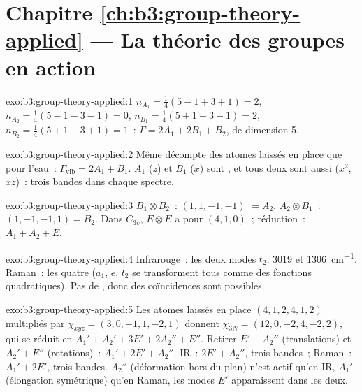 \section*{Chapitre \ref{ch:b3:group-theory-applied} --- La théorie des groupes en action}

\begin{solution}{exo:b3:group-theory-applied:1}
$n_{A_1} = \frac14(5 - 1 + 3 + 1) = 2$, $n_{A_2} = \frac14(5 - 1 - 3 - 1) = 0$,
$n_{B_1} = \frac14(5 + 1 + 3 - 1) = 2$, $n_{B_2} = \frac14(5 + 1 - 3 + 1) = 1$~:
$\Gamma = 2A_1 + 2B_1 + B_2$, de dimension 5.
\end{solution}

\begin{solution}{exo:b3:group-theory-applied:2}
Même décompte des atomes laissés en place que pour l'eau~: $\Gamma_{\mathrm{vib}} = 2A_1 + B_1$.
$A_1$ ($z$) et
$B_1$ ($x$) sont , et tous deux sont aussi 
($x^2$, $xz$)~: trois bandes dans chaque spectre.
\end{solution}

\begin{solution}{exo:b3:group-theory-applied:3}
$B_1\otimes B_2$~:  $(1, 1, -1, -1)$ $= A_2$. $A_2\otimes B_1$~: $(1, -1, -1,
1) = B_2$. Dans $C_{3v}$, $E\otimes E$ a pour  $(4, 1, 0)$~;
réduction~: $A_1 + A_2 +
E$.
\end{solution}

\begin{solution}{exo:b3:group-theory-applied:4}
Infrarouge~: les deux modes $t_2$, 3019 et \qty{1306}{cm^{-1}}. Raman~:
les quatre ($a_1$,
$e$, $t_2$ se transforment tous comme des fonctions quadratiques). Pas de
, donc des coïncidences sont possibles.
\end{solution}

\begin{solution}{exo:b3:group-theory-applied:5}
Les atomes laissés en place $(4, 1, 2, 4, 1, 2)$ multipliés par $\chi_{xyz} = (3, 0, -1, 1, -2, 1)$ donnent
$\chi_{3N} = (12, 0, -2, 4, -2, 2)$, qui se réduit en $A_1' + A_2' + 3E' + 2A_2'' +
E''$. Retirer $E' + A_2''$ (translations) et $A_2' + E''$ (rotations)~: $A_1' + 2E'
+ A_2''$. IR~: $2E' + A_2''$, trois bandes~; Raman~: $A_1' + 2E'$, trois
bandes. $A_2''$
(déformation hors du plan) n'est actif qu'en IR, $A_1'$ (élongation
symétrique) qu'en Raman, les modes $E'$ apparaissent dans les deux.
\end{solution}

